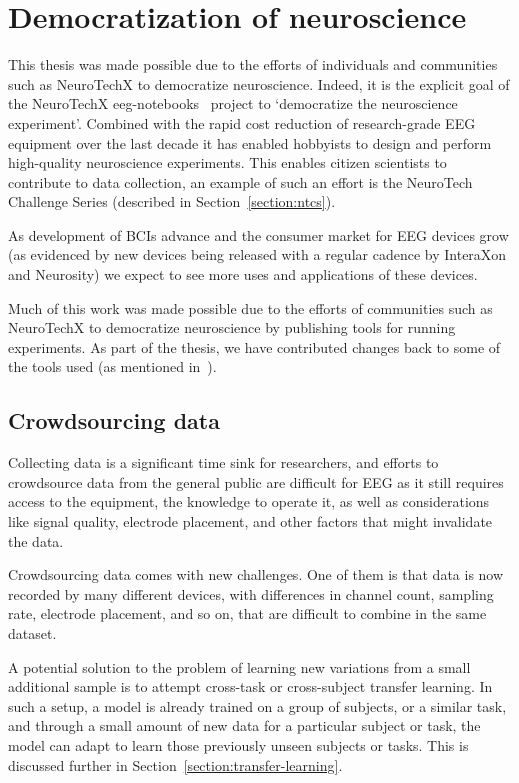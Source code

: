 \section{Democratization of neuroscience}

    This thesis was made possible due to the efforts of individuals and communities such as NeuroTechX to democratize neuroscience. Indeed, it is the explicit goal of the NeuroTechX eeg-notebooks~\cite{barachant_eeg-notebooks_2020} project to `democratize the neuroscience experiment'. Combined with the rapid cost reduction of research-grade EEG equipment over the last decade it has enabled hobbyists to design and perform high-quality neuroscience experiments. This enables citizen scientists to contribute to data collection, an example of such an effort is the NeuroTech Challenge Series (described in Section~\ref{section:ntcs}).

    As development of BCIs advance and the consumer market for EEG devices grow (as evidenced by new devices being released with a regular cadence by InteraXon and Neurosity) we expect to see more uses and applications of these devices.

    Much of this work was made possible due to the efforts of communities such as NeuroTechX to democratize neuroscience by publishing tools for running experiments. As part of the thesis, we have contributed changes back to some of the tools used (as mentioned in~).

\subsection{Crowdsourcing data}

    Collecting data is a significant time sink for researchers, and efforts to crowdsource data from the general public are difficult for EEG as it still requires access to the equipment, the knowledge to operate it, as well as considerations like signal quality, electrode placement, and other factors that might invalidate the data.

    Crowdsourcing data comes with new challenges. One of them is that data is now recorded by many different devices, with differences in channel count, sampling rate, electrode placement, and so on, that are difficult to combine in the same dataset. 

    A potential solution to the problem of learning new variations from a small additional sample is to attempt cross-task or cross-subject transfer learning. In such a setup, a model is already trained on a group of subjects, or a similar task, and through a small amount of new data for a particular subject or task, the model can adapt to learn those previously unseen subjects or tasks. This is discussed further in Section~\ref{section:transfer-learning}.

